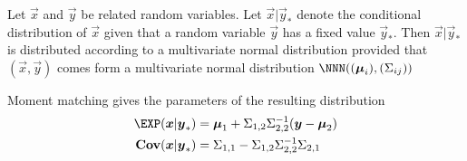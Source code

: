 \documentclass[landscape,footrule]{foils}
\newcommand{\COV}{\mathbf{Cov}}
\begin{document}
Let $\vec{x}$ and $\vec{y}$ be related random variables. 
Let $\vec{x}|\vec{y}_*$ denote the conditional distribution of $\vec{x}$ given that a random variable $\vec{y}$ has a fixed value $\vec{y}_*$.
Then $\vec{x}|\vec{y}_*$ is distributed according to a multivariate normal distribution provided that 
 $(\vec{x},\vec{y})$ comes form a multivariate normal distribution $\NNN((\vec{\mu}_i),(\Sigma_{ij}))$

\begin{triangles}
\item Moment matching gives the parameters of the resulting distribution 
\begin{align*}
\EXP(\vec{x}|\vec{y}_*)&= \vec{\mu}_1+ \Sigma_{1,2}\Sigma_{2,2}^{-1}(\vec{y}-\vec{\mu}_2)\\
\COV(\vec{x}|\vec{y}_*)&= \Sigma_{1,1}-\Sigma_{1,2}\Sigma_{2,2}^{-1}\Sigma_{2,1}\\
\end{align*}
\end{triangles}

\end{document}
